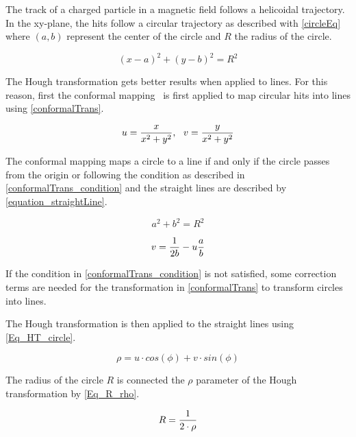 The track of a charged particle in a magnetic field follows a helicoidal trajectory. In the xy-plane, the hits follow a circular trajectory as described with \cref{circleEq} where $(a, b)$ represent the center of the circle and $R$ the radius of the circle.

\begin{equation}
  {(x-a)}^2 + {(y-b)}^2 = R^2
	\label{circleEq}
\end{equation}

The Hough transformation gets better results when applied to lines. For this reason, first the conformal mapping~\cite{Hansroul:1988wa} is first applied to map circular hits into lines using \cref{conformalTrans}.

\begin{equation}
  u = {{x} \over {x^2+y^2}} , \,\,\,\, v = {{y} \over {x^2+y^2}}
	\label{conformalTrans}
\end{equation}

The conformal mapping maps a circle to a line if and only if the circle passes from the origin or following the condition as described in \cref{conformalTrans_condition} and the straight lines are described by \cref{equation_straightLine}.

\begin{equation}
  a^2 + b^2 = R^2
	\label{conformalTrans_condition}
\end{equation}

\begin{equation}
  v = {1 \over {2b}} - u {a \over b}
	\label{equation_straightLine}
\end{equation}

If the condition in \cref{conformalTrans_condition} is not satisfied, some correction terms are needed for the transformation in \cref{conformalTrans} to transform circles into lines.

The Hough transformation is then applied to the straight lines using \cref{Eq_HT_circle}.

\begin{equation}
	\rho = u \cdot cos(\phi) + v \cdot sin(\phi)
	\label{Eq_HT_circle}
\end{equation}

The radius of the circle $R$ is connected the $\rho$ parameter of the Hough transformation by \cref{Eq_R_rho}.

\begin{equation}
	R = {1 \over {2 \cdot \rho}}
	\label{Eq_R_rho}
\end{equation}

